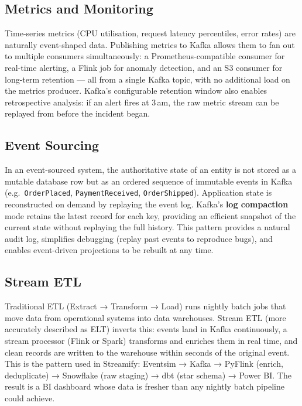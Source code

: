 \subsection{Metrics and Monitoring}

Time-series metrics (CPU utilisation, request latency percentiles, error rates) are naturally
event-shaped data.
Publishing metrics to Kafka allows them to fan out to multiple consumers simultaneously:
a Prometheus-compatible consumer for real-time alerting, a Flink job for anomaly detection,
and an S3 consumer for long-term retention — all from a single Kafka topic, with no additional
load on the metrics producer.
Kafka's configurable retention window also enables retrospective analysis: if an alert fires at
3\,am, the raw metric stream can be replayed from before the incident began.

\subsection{Event Sourcing}

In an event-sourced system, the authoritative state of an entity is not stored as a mutable
database row but as an ordered sequence of immutable events in Kafka (e.g.\ \texttt{OrderPlaced},
\texttt{PaymentReceived}, \texttt{OrderShipped}).
Application state is reconstructed on demand by replaying the event log.
Kafka's \textbf{log compaction} mode retains the latest record for each key, providing an
efficient snapshot of the current state without replaying the full history.
This pattern provides a natural audit log, simplifies debugging (replay past events to reproduce
bugs), and enables event-driven projections to be rebuilt at any time.

\subsection{Stream ETL}

Traditional ETL (Extract → Transform → Load) runs nightly batch jobs that move data from
operational systems into data warehouses.
Stream ETL (more accurately described as ELT) inverts this: events land in Kafka continuously,
a stream processor (Flink or Spark) transforms and enriches them in real time, and clean records
are written to the warehouse within seconds of the original event.
This is the pattern used in Streamify: Eventsim → Kafka → PyFlink (enrich, deduplicate) →
Snowflake (raw staging) → dbt (star schema) → Power BI.
The result is a BI dashboard whose data is fresher than any nightly batch pipeline could achieve.

